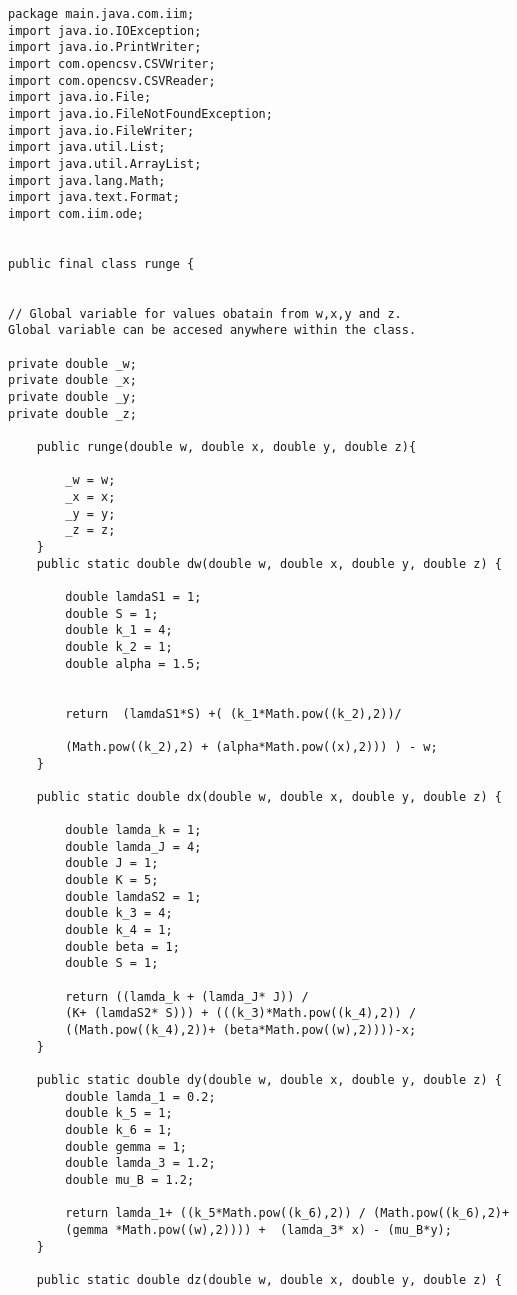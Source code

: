 \begin{framed}
\begin{verbatim}
package main.java.com.iim;
import java.io.IOException;
import java.io.PrintWriter;
import com.opencsv.CSVWriter;
import com.opencsv.CSVReader;
import java.io.File;
import java.io.FileNotFoundException;
import java.io.FileWriter;
import java.util.List;
import java.util.ArrayList;
import java.lang.Math;
import java.text.Format;
import com.iim.ode;


public final class runge {
 

// Global variable for values obatain from w,x,y and z. 
Global variable can be accesed anywhere within the class. 

private double _w;
private double _x;
private double _y;
private double _z;

    public runge(double w, double x, double y, double z){
    
        _w = w;
        _x = x;
        _y = y;
        _z = z;
    }
    public static double dw(double w, double x, double y, double z) {

        double lamdaS1 = 1;
        double S = 1;
        double k_1 = 4;
        double k_2 = 1;
        double alpha = 1.5;


        return  (lamdaS1*S) +( (k_1*Math.pow((k_2),2))/
        
        (Math.pow((k_2),2) + (alpha*Math.pow((x),2))) ) - w;
    }

    public static double dx(double w, double x, double y, double z) {

        double lamda_k = 1;
        double lamda_J = 4;
        double J = 1;
        double K = 5;
        double lamdaS2 = 1;
        double k_3 = 4;
        double k_4 = 1;
        double beta = 1;
        double S = 1;

        return ((lamda_k + (lamda_J* J)) / 
        (K+ (lamdaS2* S))) + (((k_3)*Math.pow((k_4),2)) / 
        ((Math.pow((k_4),2))+ (beta*Math.pow((w),2))))-x;
    }

    public static double dy(double w, double x, double y, double z) {
        double lamda_1 = 0.2;
        double k_5 = 1;
        double k_6 = 1;
        double gemma = 1;
        double lamda_3 = 1.2;
        double mu_B = 1.2;

        return lamda_1+ ((k_5*Math.pow((k_6),2)) / (Math.pow((k_6),2)+
        (gemma *Math.pow((w),2)))) +  (lamda_3* x) - (mu_B*y);
    }

    public static double dz(double w, double x, double y, double z) {
     

\end{verbatim}
\end{framed}
